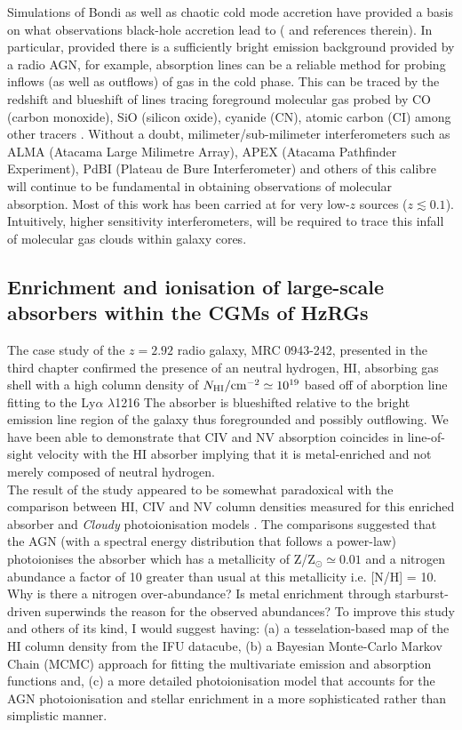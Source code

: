 Simulations of Bondi as well as chaotic cold mode accretion have provided a basis on what observations black-hole accretion lead to (\citet{Gaspari2013} and references therein). In particular, provided there is a sufficiently bright emission background provided by a radio AGN, for example, absorption lines can be a reliable method for probing inflows (as well as outflows) of gas in the cold phase. This can be traced by the
redshift and blueshift of lines tracing foreground molecular gas probed by CO (carbon monoxide), SiO (silicon oxide), cyanide (CN), atomic carbon (CI) among other tracers \citep{David2014,Tremblay2016,Ruffa2019,Rose2019}. Without a doubt, milimeter/sub-milimeter interferometers such as ALMA (Atacama Large Milimetre Array), APEX (Atacama Pathfinder Experiment), PdBI (Plateau de Bure Interferometer) and others of this calibre will continue to be fundamental in obtaining observations of molecular absorption. Most of this work has been carried at for very low-$z$ sources ($z \lesssim 0.1$). Intuitively, higher sensitivity interferometers, will be required to trace this infall of molecular gas clouds within galaxy cores. \\

\subsection{Enrichment and ionisation of large-scale absorbers within the CGMs of HzRGs}

The case study of the $z=2.92$ radio galaxy, MRC 0943-242, presented in the third chapter confirmed the presence of an neutral hydrogen, HI, absorbing gas shell with a high column density of $N_{\rm HI}/\rm{cm}^{-2} \simeq 10^{19}$ based off of aborption line fitting to the Ly$\alpha$ $\lambda$1216 The absorber is blueshifted relative to the bright emission line region of the galaxy thus foregrounded and possibly outflowing. We have been able to demonstrate that CIV and NV absorption coincides in line-of-sight velocity with the HI absorber implying that it is metal-enriched and not merely composed of neutral hydrogen. \\

The result of the study appeared to be somewhat paradoxical with the comparison between HI, CIV and NV column densities measured for this enriched absorber and {\it Cloudy} photoionisation models \citep{Ferland2013}. The comparisons suggested that the AGN (with a spectral energy distribution that follows a power-law) photoionises the absorber which has a metallicity of Z/Z$_\odot \simeq 0.01$ and a nitrogen abundance a factor of 10 greater than usual at this metallicity i.e. [N/H] = 10. Why is there a nitrogen over-abundance? Is metal enrichment through starburst-driven superwinds the reason for the observed abundances? To improve this study and others of its kind, I would suggest having: (a) a tesselation-based map of the HI column density from the IFU datacube, (b) a Bayesian Monte-Carlo Markov Chain (MCMC) approach for fitting the multivariate emission and absorption functions and, (c) a more detailed photoionisation model that accounts for the AGN photoionisation and stellar enrichment in a more sophisticated rather than simplistic manner. \\

